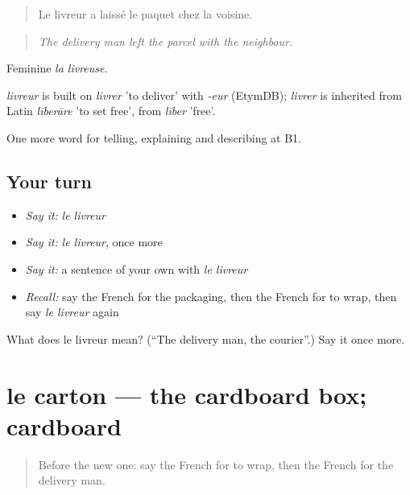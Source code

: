 \begin{quote}
Le livreur a laissé le paquet chez la voisine.
\end{quote}

\begin{quote}
\emph{The delivery man left the parcel with the neighbour.}
\end{quote}

Feminine \emph{la livreuse}.

\begin{cousinweb}
\emph{livreur} is built on \emph{livrer} 'to deliver' with \emph{-eur} (EtymDB); \emph{livrer} is inherited from Latin \emph{līberāre} 'to set free', from \emph{līber} 'free'.
\end{cousinweb}

\begin{grammarlens}[title={What you've built}]
One more word for telling, explaining and describing at B1.
\end{grammarlens}

\subsection*{Your turn}
\begin{itemize}
\raggedright
  \item \emph{Say it:} \emph{le livreur}
  \item \emph{Say it:} \emph{le livreur}, once more
  \item \emph{Say it:} a sentence of your own with \emph{le livreur}
  \item \emph{Recall:} say the French for the packaging, then the French for to wrap, then say \emph{le livreur} again
\end{itemize}

\begin{tcolorbox}[breakable,colback=teal!4,colframe=teal!35!black,title={Before you move on}]
What does le livreur mean? (\textquotedblleft{}The delivery man, the courier\textquotedblright{}.) Say it once more.
\end{tcolorbox}
\section[le carton]{le carton — the cardboard box; cardboard}

\label{lesson:FR-C453-carton}



\begin{quote}
Before the new one: say the French for to wrap, then the French for the delivery man.
\end{quote}

